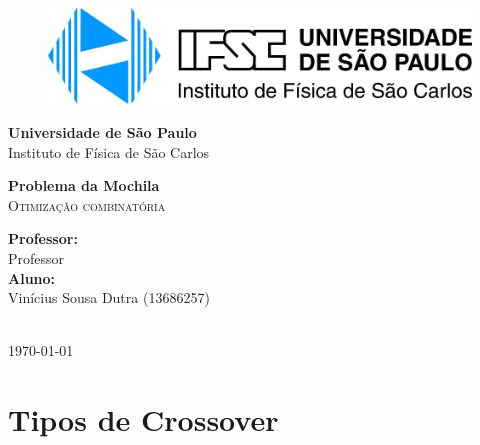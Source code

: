 \documentclass{article}
\newcommand{\theauthor}{Vinícius Sousa Dutra (13686257)}
\newcommand{\thetitle}{Problema da Mochila}
\begin{document}
\begin{titlepage}
    \begin{center}
        \begin{figure}[htb!]
            \centering
            \includegraphics[width=150mm]{../images/ifsc_logo.jpg}
        \end{figure}
        \vspace{20pt}
        \LARGE{\textbf{Universidade de São Paulo}}\\
        \LARGE{Instituto de Física de São Carlos}\\

        \vspace{150pt}

        
        \LARGE{\textbf{{\thetitle}}} 
        \\ 
        \textsc{\LARGE Otimização combinatória}
        \\
        
        
        \vspace{125pt}
        \begin{minipage}{\textwidth}
            \begin{flushleft} \large
                \textbf{Professor:}\\
                Professor\\[0.8cm]
                \textbf{Aluno:}\\
                \theauthor
                
                \end{flushleft}
                \end{minipage}\\[1 cm]
        \vspace{30pt}
        \vspace{\fill}  
        \Large {\today}

    \end{center}
\end{titlepage}

\newpage
\tableofcontents
\listoffigures
\listoftables
\listoflistings
\newpage
\section{Tipos de Crossover}

\cite{fishback2007taylor}


\end{document}
